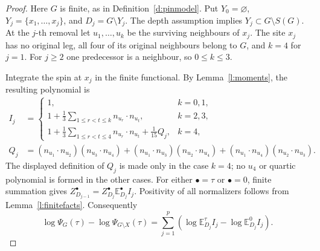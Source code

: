 \begin{proof}
Here \(G\) is finite, as in Definition~\ref{d:pinmodel}.
Put \(Y_0=\varnothing\), \(Y_j=\{x_1,\ldots,x_j\}\), and
\(D_j=G\setminus Y_j\).  The depth assumption implies
\(Y_j\subset G\setminus S(G)\).  At the \(j\)-th removal let
\(u_1,\ldots,u_k\) be the surviving neighbours of \(x_j\).
The site \(x_j\) has no original leg, all four of its original
neighbours belong to \(G\), and \(k=4\) for \(j=1\).
For \(j\ge2\) one predecessor is a neighbour, so \(0\le k\le3\).

Integrate the spin at \(x_j\) in the finite functional.  By
Lemma~\ref{l:moments}, the resulting polynomial is
\begin{equation}\label{e:removalpolynomial}
 \begin{split}
 I_j&=\begin{cases}
 1,&k=0,1,\\
 1+\frac13\displaystyle\sum_{1\le r<t\le k}n_{u_r}\cdot n_{u_t},
       &k=2,3,\\
 1+\frac13\displaystyle\sum_{1\le r<t\le4}n_{u_r}\cdot n_{u_t}
                    +\frac1{15}Q_j,&k=4,
 \end{cases}\\
 Q_j&=(n_{u_1}\cdot n_{u_2})(n_{u_3}\cdot n_{u_4})
      +(n_{u_1}\cdot n_{u_3})(n_{u_2}\cdot n_{u_4})
      +(n_{u_1}\cdot n_{u_4})(n_{u_2}\cdot n_{u_3}).
 \end{split}
\end{equation}
The displayed definition of \(Q_j\) is made only in the case
\(k=4\); no \(u_4\) or quartic polynomial is formed in the other
cases.  For either
\(\bullet=\tau\) or \(\bullet=0\), finite summation gives
\(Z_{D_{j-1}}^\bullet=Z_{D_j}^\bullet
\mathbb E_{D_j}^\bullet I_j\).  Positivity of all normalizers
follows from Lemma~\ref{l:finitefacts}.  Consequently
\begin{equation}\label{e:removaltelescope}
 \log\Psi_G(\tau)-\log\Psi_{G\setminus X}(\tau)
   =\sum_{j=1}^p
      \left(\log\mathbb E_{D_j}^\tau I_j
                         -\log\mathbb E_{D_j}^0 I_j\right).
\end{equation}


\end{proof}
